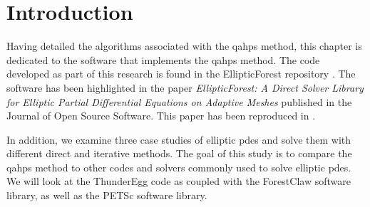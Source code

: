 \section{Introduction}

Having detailed the algorithms associated with the \gls{qahps} method, this chapter is dedicated to the software that implements the \gls{qahps} method. The code developed as part of this research is found in the EllipticForest repository \citep{chipman2024ellipticforest}. The software has been highlighted in the paper {\em EllipticForest: A Direct Solver Library for Elliptic Partial Differential Equations on Adaptive Meshes} published in the Journal of Open Source Software. This paper has been reproduced in .

In addition, we examine three case studies of elliptic \gls{pdes} and solve them with different direct and iterative methods. The goal of this study is to compare the \gls{qahps} method to other codes and solvers commonly used to solve elliptic \gls{pdes}. We will look at the ThunderEgg \citep{aiton2022thunderegg} code as coupled with the ForestClaw \citep{calhoun2017forestclaw} software library, as well as the PETSc \citep{anl2023petsc} software library.